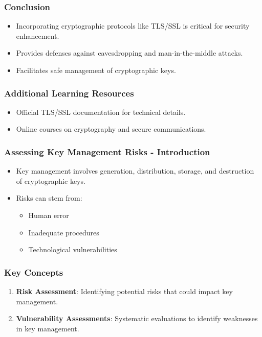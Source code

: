 \documentclass{beamer}
\begin{document}
\begin{frame}[fragile]
    \frametitle{Conclusion}
    \begin{itemize}
        \item Incorporating cryptographic protocols like TLS/SSL is critical for security enhancement.
        \item Provides defenses against eavesdropping and man-in-the-middle attacks.
        \item Facilitates safe management of cryptographic keys.
    \end{itemize}
\end{frame}

\begin{frame}[fragile]
    \frametitle{Additional Learning Resources}
    \begin{itemize}
        \item Official TLS/SSL documentation for technical details.
        \item Online courses on cryptography and secure communications.
    \end{itemize}
\end{frame}

\begin{frame}[fragile]
    \frametitle{Assessing Key Management Risks - Introduction}
    \begin{itemize}
        \item Key management involves generation, distribution, storage, and destruction of cryptographic keys.
        \item Risks can stem from:
        \begin{itemize}
            \item Human error
            \item Inadequate procedures
            \item Technological vulnerabilities
        \end{itemize}
    \end{itemize}
\end{frame}

\begin{frame}[fragile]
    \frametitle{Key Concepts}
    \begin{enumerate}
        \item \textbf{Risk Assessment}: Identifying potential risks that could impact key management.
        \item \textbf{Vulnerability Assessments}: Systematic evaluations to identify weaknesses in key management.
    \end{enumerate}
\end{frame}
\end{document}
